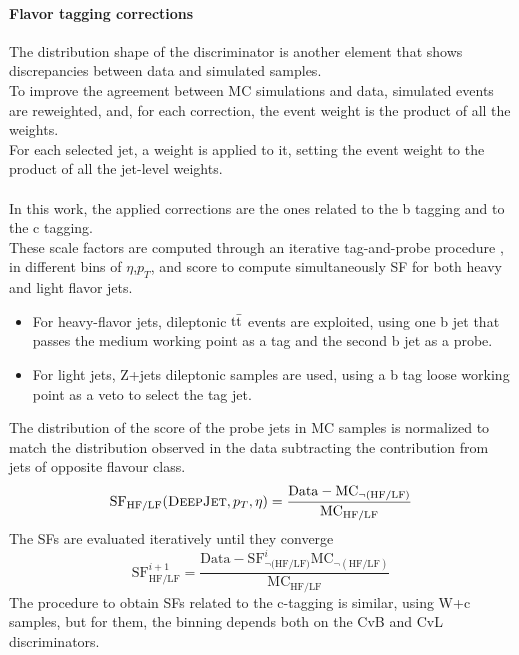 \paragraph*{Flavor tagging corrections}
The distribution shape of the \DeepJet discriminator is another element that shows discrepancies between data and simulated samples.\\
To improve the agreement between MC simulations and data, simulated events are reweighted, and, for each correction, the event weight is the product of all the weights.\\
For each selected jet, a weight is applied to it, setting the event weight to the product of all the jet-level weights.
\\
\\
In this work, the applied corrections are the ones related to the b tagging and to the c tagging.\\
These scale factors are computed through an iterative tag-and-probe procedure \cite{2021B-tagging2018.}, in different bins of $\eta$,$p_T$, and \DeepJet score to compute simultaneously SF for both heavy and light flavor jets.
\begin{itemize}
    \item For heavy-flavor jets, dileptonic ${{\text{t}}{\bar{\text{t}}}}$ events are exploited, using one b jet that passes the medium working point as a tag and the second b jet as a probe.
    \item For light jets, Z+jets dileptonic samples are used, using a b tag loose working point as a veto to select the tag jet.
\end{itemize}
The distribution of the \DeepJet score of the probe jets in MC samples is normalized to match the distribution observed in the data subtracting the contribution from jets of opposite flavour class.
\begin{equation}
    \text{SF}_{\text{HF/LF}} ({\textsc{DeepJet}},p_T,\eta)=\frac{\text{Data}-\text{MC}_{\neg(\text{HF/LF})}}{\text{MC}_{\text{HF/LF}}}
\end{equation}
The SFs are evaluated iteratively until they converge
\begin{equation}
    \text{SF}_{\text{HF/LF}}^{i+1} =\dfrac{\text{Data}-\text{SF}_{\neg (\text{HF/LF)}}^{i} \text{MC}_{\neg(\text{HF/LF})}}{\text{MC}_{\text{HF/LF}}}
\end{equation}
The procedure to obtain SFs related to the c-tagging is similar, using W+c samples, but for them, the binning depends both on the CvB and CvL discriminators.



